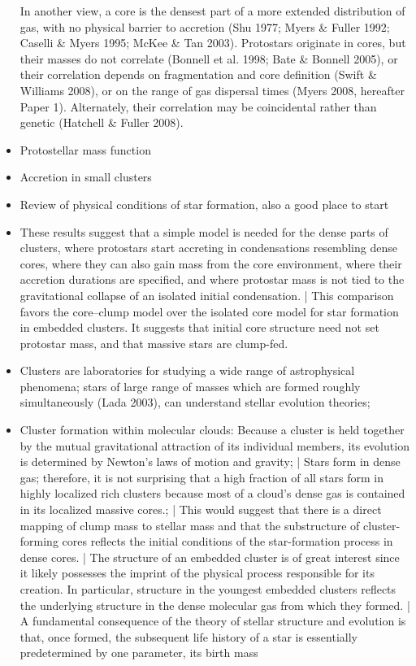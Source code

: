 \begin{itemize}
In another view, a core is the densest part of a more extended distribution of gas, with no physical barrier to accretion (Shu 1977; Myers \& Fuller 1992; Caselli \& Myers 1995; McKee \& Tan 2003). Protostars originate in cores, but their masses do not correlate (Bonnell et al. 1998; Bate \& Bonnell 2005), or their correlation depends on fragmentation and core definition (Swift \& Williams 2008), or on the range of gas dispersal times (Myers 2008, hereafter Paper 1). Alternately, their correlation may be coincidental rather than genetic (Hatchell \& Fuller 2008).
\item \citep{McKee:2010iw} Protostellar mass function
\item \citep{Bonnell:1997vta} Accretion in small clusters
\item \citep{Evans:1999gz} Review of physical conditions of star formation, also a good place to start
\item \citep{Myers:2011fy} These results suggest that a simple model is needed for the dense parts of clusters, where protostars start accreting in condensations resembling dense cores, where they can also gain mass from the core environment, where their accretion durations are specified, and where protostar mass is not tied to the gravitational collapse of an isolated initial condensation. | This comparison favors the core–clump model over the isolated core model for star formation in embedded clusters. It suggests that initial core structure need not set protostar mass, and that massive stars are clump-fed.
\item Clusters are laboratories for studying a wide range of astrophysical phenomena; stars of large range of masses which are formed roughly simultaneously (Lada 2003), can understand stellar evolution theories; 
\item \citep{Lada:2003il} Cluster formation within molecular clouds: Because a cluster is held together by the mutual gravitational attraction of its individual members, its evolution is determined by Newton's laws of motion and gravity; |
Stars form in dense gas; therefore, it is not surprising that a high fraction of all stars form in highly localized rich clusters because most of a cloud’s dense gas is contained in its localized massive cores.; |
This would suggest that there is a direct mapping of clump mass to stellar mass and that the substructure of cluster-forming cores reflects the initial conditions of the star-formation process in dense cores. |
The structure of an embedded cluster is of great interest since it likely possesses the imprint of the physical process responsible for its creation. In particular, structure in the youngest embedded clusters reflects the underlying structure in the dense molecular gas from which they formed. | A fundamental consequence of the theory of stellar structure and evolution is that, once formed, the subsequent life history of a star is essentially predetermined by one parameter, its birth mass

\end{itemize}
